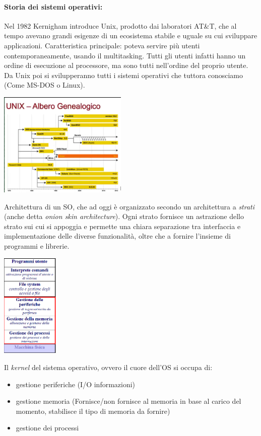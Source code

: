 \documentclass[
  paper=a4,
  oneside  ,captions=tableheading
]{scrbook}
\providecommand{\tightlist}{%
  \setlength{\itemsep}{0pt}\setlength{\parskip}{0pt}}
\begin{document}
\hypertarget{storia-dei-sistemi-operativi}{%
\paragraph{Storia dei sistemi
operativi:}\label{storia-dei-sistemi-operativi}}

Nel 1982 Kernigham introduce Unix, prodotto dai laboratori AT\&T, che al
tempo avevano grandi esigenze di un ecosistema stabile e uguale su cui
sviluppare applicazioni. Caratteristica principale: poteva servire più
utenti contemporaneamente, usando il multitasking. Tutti gli utenti
infatti hanno un ordine di esecuzione al processore, ma sono tutti
nell'ordine del proprio utente. Da Unix poi si svilupperanno tutti i
sistemi operativi che tuttora conosciamo (Come MS-DOS o Linux).

\includegraphics[height=5cm]{./image/image-20200930171019756.png}

Architettura di un SO, che ad oggi è organizzato secondo un architettura
a \emph{strati} (anche detta \emph{onion skin architecture}). Ogni
strato fornisce un astrazione dello strato sui cui si appoggia e
permette una chiara separazione tra interfaccia e implementazione delle
diverse funzionalità, oltre che a fornire l'insieme di programmi e
librerie.

\includegraphics[height=5cm]{./image/image-2020112323365770.png}

Il \emph{kernel} del sistema operativo, ovvero il cuore dell'OS si
occupa di:

\begin{itemize}
\tightlist
\item
  gestione periferiche (I/O informazioni)
\item
  gestione memoria (Fornisce/non fornisce al memoria in base al carico
  del momento, stabilisce il tipo di memoria da fornire)
\item
  gestione dei processi
\end{itemize}
\end{document}
